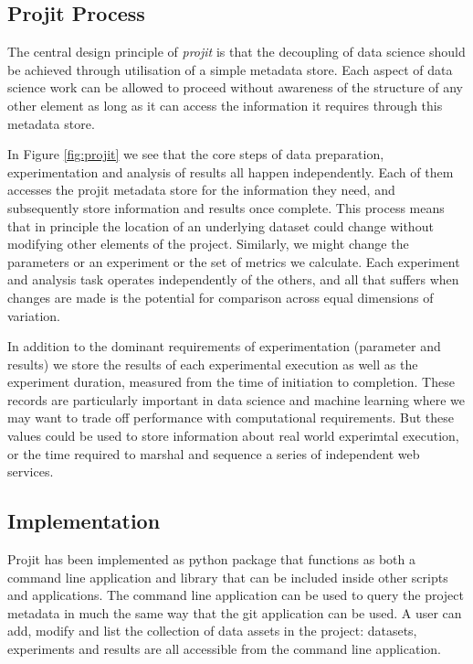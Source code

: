 \documentclass[sigconf]{acmart}
\begin{document}
\subsection{Projit Process}

The central design principle of \textit{projit} is that the decoupling of data science 
should be achieved through utilisation of a simple metadata store. Each aspect of 
data science work can be allowed to proceed without awareness of the structure of 
any other element as long as it can access the information it requires through this
metadata store.

In Figure \ref{fig:projit} we see that the core steps of data preparation, experimentation
and analysis of results all happen independently. Each of them accesses the projit metadata 
store for the information they need, and subsequently store information and results once complete.
This process means that in principle the location of an underlying dataset could change without
modifying other elements of the project. Similarly, we might change the parameters or an experiment
or the set of metrics we calculate. Each experiment and analysis task operates independently of the
others, and all that suffers when changes are made is the potential for comparison across equal
dimensions of variation.

In addition to the dominant requirements of experimentation (parameter and results) we store the results
of each experimental execution as well as the experiment duration, measured from the time of initiation
to completion. These records are particularly important in data science and machine learning where we
may want to trade off performance with computational requirements. But these values could be used to store
information about real world experimtal execution, or the time required to marshal and sequence a series
of independent web services. 


\subsection{Implementation}

Projit has been implemented as python package that functions as both a command line application
and library that can be included inside other scripts and applications. The command line application
can be used to query the project metadata in much the same way that the git application can be used.
A user can add, modify and list the collection of data assets in the project: datasets, experiments 
and results are all accessible from the command line application.
\end{document}
